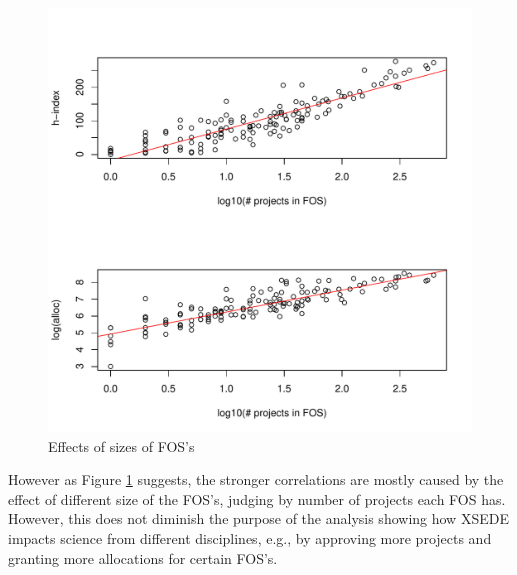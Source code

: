 \documentclass{sig-alternate}
\begin{document}
\begin{figure}[htb] 
  \centering 
    \includegraphics[width=1.0\columnwidth]{images/05_hindexalloc_vs_nprojects_fos_trended.pdf} 
  \caption{Effects of sizes of FOS’s}\label{F:hindexalloc-vs-nprojects-fos-trended} 
\end{figure} 
 
However as Figure \ref{F:hindexalloc-vs-nprojects-fos-trended} suggests, the stronger correlations are mostly caused by the effect of different size of the FOS’s, judging by number of projects each FOS has. However, this does not diminish the purpose of the analysis showing how XSEDE impacts science from different disciplines, e.g., by approving more projects and granting more allocations for certain FOS’s. 
 
\end{document}
